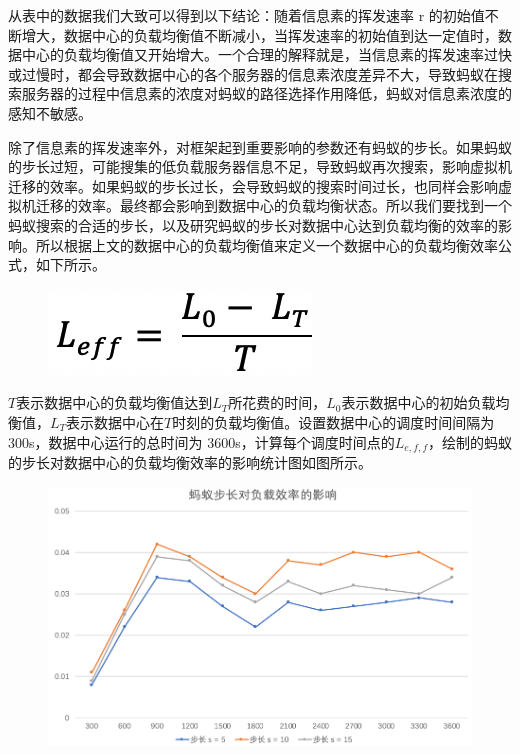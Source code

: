 从表中的数据我们大致可以得到以下结论：随着信息素的挥发速率 r 的初始值不断增大，数据中心的负载均衡值不断减小，当挥发速率的初始值到达一定值时，数据中心的负载均衡值又开始增大。一个合理的解释就是，当信息素的挥发速率过快或过慢时，都会导致数据中心的各个服务器的信息素浓度差异不大，导致蚂蚁在搜索服务器的过程中信息素的浓度对蚂蚁的路径选择作用降低，蚂蚁对信息素浓度的感知不敏感。

除了信息素的挥发速率外，对框架起到重要影响的参数还有蚂蚁的步长。如果蚂蚁的步长过短，可能搜集的低负载服务器信息不足，导致蚂蚁再次搜索，影响虚拟机迁移的效率。如果蚂蚁的步长过长，会导致蚂蚁的搜索时间过长，也同样会影响虚拟机迁移的效率。最终都会影响到数据中心的负载均衡状态。所以我们要找到一个蚂蚁搜索的合适的步长，以及研究蚂蚁的步长对数据中心达到负载均衡的效率的影响。所以根据上文的数据中心的负载均衡值来定义一个数据中心的负载均衡效率公式，如下所示。

\begin{figure}[htbp]
  \centering
  \includegraphics[width=0.6\linewidth]{./Figure/IMG_Chap4_6.png}
\end{figure}

$ T $表示数据中心的负载均衡值达到$ L_T $所花费的时间，$ L_0 $表示数据中心的初始负载均衡值，$ L_T $表示数据中心在$ T $时刻的负载均衡值。设置数据中心的调度时间间隔为 300s，数据中心运行的总时间为 3600s，计算每个调度时间点的$ L_{e,f,f} $，绘制的蚂蚁的步长对数据中心的负载均衡效率的影响统计图如图所示。

\begin{figure}[htbp]
  \centering
  \includegraphics{./Figure/IMG_Chap4_7.png}
\end{figure}

